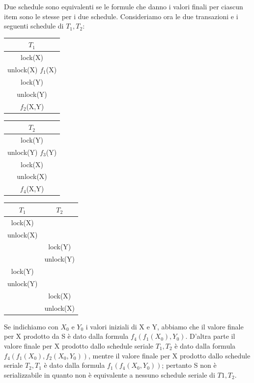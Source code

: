 Due schedule sono equivalenti se le formule che danno i valori finali per ciascun item sono le stesse per i due schedule. Consideriamo ora le due transazioni e i seguenti schedule di $T_1 ,T_2$:
\begin{center}
    \begin{tabular}{|c|}
        \hline $T_1$\\\hline
        lock(X)\\
        unlock(X) $f_1$(X)\\
        lock(Y)\\
        unlock(Y)\\
        $f_2$(X,Y)\\\hline
    \end{tabular}
    \begin{tabular}{|c|}
        \hline $T_2$\\\hline
        lock(Y)\\
        unlock(Y) $f_3$(Y)\\
        lock(X)\\
        unlock(X)\\
        $f_4$(X,Y)\\\hline
    \end{tabular}\hspace{1cm}
    \begin{tabular}{|c|c|}
        \hline $T_1$&$T_2$ \\\hline
        lock(X) & \\
        unlock(X) & \\
        & lock(Y)\\
        & unlock(Y)\\
        lock(Y) & \\
        unlock(Y) & \\
        & lock(X)\\
        & unlock(X)\\\hline
    \end{tabular}
\end{center}
Se indichiamo con $X_0$ e $Y_0$ i valori iniziali di X e Y, abbiamo che il valore finale per X prodotto da S è dato dalla formula $f_4 (f_1 (X_0 ), Y_0)$. D'altra parte il valore finale per X prodotto dallo schedule seriale $T_1 ,T_2$ è dato dalla formula $f_4 (f_1 (X_0 ), f_2 (X_0,Y_0))$, mentre il valore finale per X prodotto dallo schedule seriale $T_2 ,T_1$ è dato dalla formula $f_1 (f_4 (X_0 , Y_0 ))$; pertanto S non è serializzabile in quanto non è equivalente a nessuno schedule seriale di $T1 ,T_2$.


